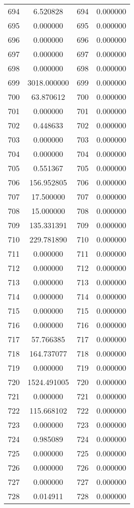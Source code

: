 \documentclass[12pt]{article}
\begin{document}
\begin{longtable}{@{}cccc@{}}
694 & 6.520828 & 694 & 0.000000 \\
695 & 0.000000 & 695 & 0.000000 \\
696 & 0.000000 & 696 & 0.000000 \\
697 & 0.000000 & 697 & 0.000000 \\
698 & 0.000000 & 698 & 0.000000 \\
699 & 3018.000000 & 699 & 0.000000 \\
700 & 63.870612 & 700 & 0.000000 \\
701 & 0.000000 & 701 & 0.000000 \\
702 & 0.448633 & 702 & 0.000000 \\
703 & 0.000000 & 703 & 0.000000 \\
704 & 0.000000 & 704 & 0.000000 \\
705 & 0.551367 & 705 & 0.000000 \\
706 & 156.952805 & 706 & 0.000000 \\
707 & 17.500000 & 707 & 0.000000 \\
708 & 15.000000 & 708 & 0.000000 \\
709 & 135.331391 & 709 & 0.000000 \\
710 & 229.781890 & 710 & 0.000000 \\
711 & 0.000000 & 711 & 0.000000 \\
712 & 0.000000 & 712 & 0.000000 \\
713 & 0.000000 & 713 & 0.000000 \\
714 & 0.000000 & 714 & 0.000000 \\
715 & 0.000000 & 715 & 0.000000 \\
716 & 0.000000 & 716 & 0.000000 \\
717 & 57.766385 & 717 & 0.000000 \\
718 & 164.737077 & 718 & 0.000000 \\
719 & 0.000000 & 719 & 0.000000 \\
720 & 1524.491005 & 720 & 0.000000 \\
721 & 0.000000 & 721 & 0.000000 \\
722 & 115.668102 & 722 & 0.000000 \\
723 & 0.000000 & 723 & 0.000000 \\
724 & 0.985089 & 724 & 0.000000 \\
725 & 0.000000 & 725 & 0.000000 \\
726 & 0.000000 & 726 & 0.000000 \\
727 & 0.000000 & 727 & 0.000000 \\
728 & 0.014911 & 728 & 0.000000 \\

\end{longtable}
\end{document}
